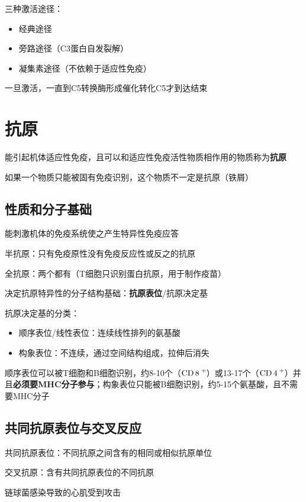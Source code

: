 三种激活途径：
\begin{itemize}
    \item 经典途径
    \item 旁路途径（C3蛋白自发裂解）
    \item 凝集素途径（不依赖于适应性免疫）
\end{itemize}
一旦激活，一直到C5转换酶形成催化转化C5才到达结束
\section{抗原}%
\label{sec:抗原}
\begin{notation}
    能引起机体适应性免疫，且可以和适应性免疫活性物质相作用的物质称为\textbf{抗原}
\end{notation}
如果一个物质只能被固有免疫识别，这个物质不一定是抗原（铁屑）
\subsection{性质和分子基础}%
\label{sub:性质和分子基础}
\begin{defi}
    能刺激机体的免疫系统使之产生特异性免疫应答
\end{defi}
\begin{notation}
    半抗原：只有免疫原性没有免疫反应性或反之的抗原

    全抗原：两个都有（T细胞只识别蛋白抗原，用于制作疫苗）
\end{notation}
决定抗原特异性的分子结构基础：\textbf{抗原表位}/抗原决定基
\begin{notation}
    抗原决定基的分类：
    \begin{itemize}
        \item 顺序表位/线性表位：连续线性排列的氨基酸
        \item 构象表位：不连续，通过空间结构组成，拉伸后消失
    \end{itemize}
顺序表位可以被T细胞和B细胞识别，约8-10个（$\ce{CD 8^+}$）或13-17个（$\ce{CD 4^+}$）并且\textbf{必须要MHC分子参与}；构象表位只能被B细胞识别，约5-15个氨基酸，且不需要MHC分子
\end{notation}
\subsection{共同抗原表位与交叉反应}%
\label{sub:共同抗原表位与交叉反应}
\begin{defi}
    共同抗原表位：不同抗原之间含有的相同或相似抗原单位

    交叉抗原：含有共同抗原表位的不同抗原
\end{defi}
\begin{eg}
    链球菌感染导致的心肌受到攻击
\end{eg}
